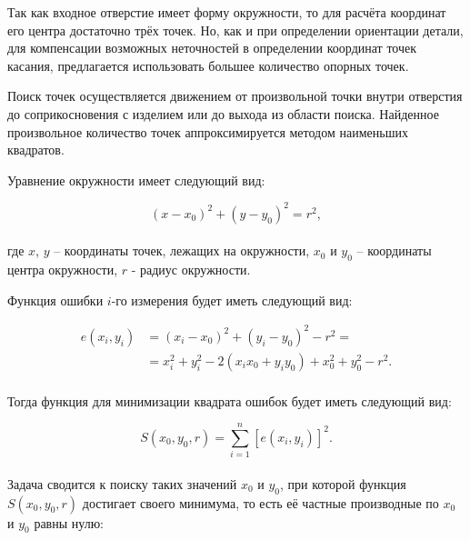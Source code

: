 Так как входное отверстие имеет форму окружности, то для расчёта координат его центра достаточно трёх точек.
Но, как и при определении ориентации детали, для компенсации возможных неточностей в определении координат точек касания, предлагается использовать большее количество опорных точек.

Поиск точек осуществляется движением от произвольной точки внутри отверстия до соприкосновения с изделием или до выхода из области поиска.
Найденное произвольное количество точек аппроксимируется методом наименьших квадратов.

Уравнение окружности имеет следующий вид:

\begin{equation*}
    \left( x - x_0 \right)^2 + \left( y - y_0 \right)^2 = r^2,
\end{equation*} \\
где $x$, $y$ -- координаты точек, лежащих на окружности, $x_0$ и $y_0$ -- координаты центра окружности, $r$ - радиус окружности.

Функция ошибки $i$-го измерения будет иметь следующий вид:

\begin{equation}
    \begin{aligned}
        \label{eq:FindDetail:Circle_MNK_e}
        e(x_i, y_i) &= \left( x_i - x_0 \right)^2 + \left( y_i - y_0 \right)^2 - r^2 = \\
        &= x_i^2 + y_i^2 - 2 (x_i x_0 + y_i y_0) + x_0^2 + y_0^2 - r^2.
    \end{aligned}
\end{equation} \\

Тогда функция для минимизации квадрата ошибок будет иметь следующий вид:

\begin{equation*}
    S(x_0, y_0, r) = \sum_{i=1}^{n} \left[ e(x_i, y_i) \right]^2.
\end{equation*} \\

Задача сводится к поиску таких значений $x_0$ и $y_0$, при которой функция $S(x_0, y_0, r)$ достигает своего минимума, то есть её частные производные по $x_0$ и $y_0$ равны нулю:

